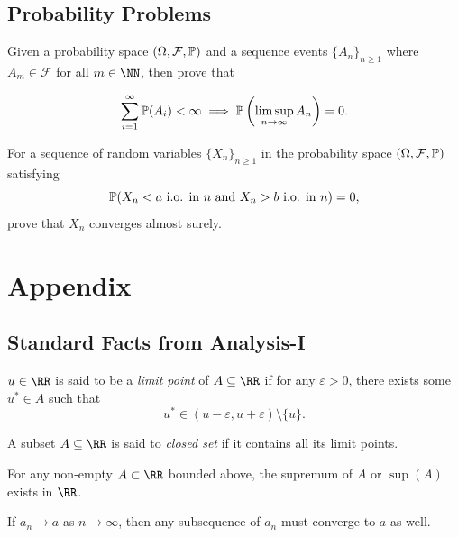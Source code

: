 \documentclass[parskip=half, numbers=endperiod, 11pt]{scrartcl}
\begin{document}
\subsection{Probability Problems}
\begin{problem}
Given a probability space $(\Omega, \mathcal F, \mathbb{P})$
and a sequence events $\{A_n\}_{n \ge 1}$ where
$A_m \in \mathcal F$ for all $m \in \NN$, then prove
that

\[\sum_{i = 1}^\infty \mathbb{P}(A_i) < \infty \implies \mathbb{P}\left(\limsup_{n \to \infty} A_n\right) = 0.\]
\end{problem}

\begin{problem}
For a sequence of random variables $\{X_n\}_{n \ge 1}$
in the probability space $(\Omega, \mathcal F, \mathbb{P})$
satisfying
\[\mathbb{P}(X_n < a \,\,\text{i.o. in $n$ and } X_n > b\,\,\text{i.o. in $n$}) = 0,\]
prove that $X_n$ converges almost surely.
\end{problem}

\newpage
\appendix
\section{Appendix}

\subsection{Standard Facts from Analysis-I}

\begin{definition}
	$u \in \RR$ is said to be a \emph{limit point} of
	$A \subseteq \RR$ if for any $\varepsilon > 0$,
	there exists some $u^\ast \in A$ such that
	\[u^\ast \in (u - \varepsilon, u + \varepsilon)\setminus \{u\}. \]
\end{definition}

\begin{definition}
	A subset $A \subseteq \RR$ is said to
	\emph{closed set} if it contains all its limit points.
\end{definition}

\begin{axiom}\label{axiom:completeness}
	For any non-empty $A \subset \RR$ bounded above, the
	supremum of $A$ or $\sup(A)$ exists in $\RR$.
\end{axiom}

\begin{theorem}\label{thm:subseq_conv}
	If $a_n \to a$ as $n \to \infty$, then any
	subsequence of $a_n$ must converge to $a$ as well.
\end{theorem}
\end{document}
